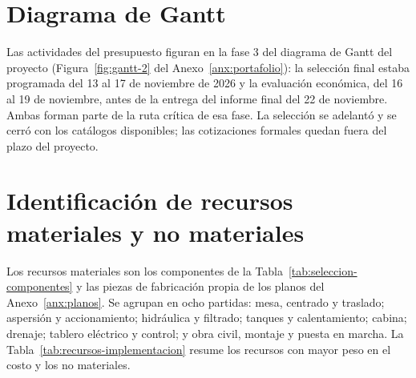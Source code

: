 \section{Diagrama de Gantt}

Las actividades del presupuesto figuran en la fase 3 del diagrama de Gantt del proyecto (Figura~\ref{fig:gantt-2} del Anexo~\ref{anx:portafolio}): la selección final estaba programada del 13 al 17 de noviembre de 2026 y la evaluación económica, del 16 al 19 de noviembre, antes de la entrega del informe final del 22 de noviembre. Ambas forman parte de la ruta crítica de esa fase. La selección se adelantó y se cerró con los catálogos disponibles; las cotizaciones formales quedan fuera del plazo del proyecto.

\section{Identificación de recursos materiales y no materiales}

Los recursos materiales son los componentes de la Tabla~\ref{tab:seleccion-componentes} y las piezas de fabricación propia de los planos del Anexo~\ref{anx:planos}. Se agrupan en ocho partidas: mesa, centrado y traslado; aspersión y accionamiento; hidráulica y filtrado; tanques y calentamiento; cabina; drenaje; tablero eléctrico y control; y obra civil, montaje y puesta en marcha. La Tabla~\ref{tab:recursos-implementacion} resume los recursos con mayor peso en el costo y los no materiales.

